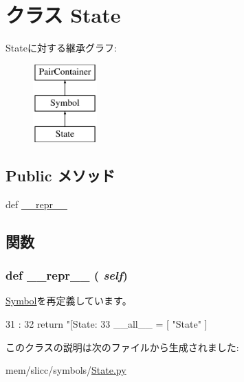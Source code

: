 \hypertarget{classslicc_1_1symbols_1_1State_1_1State}{
\section{クラス State}
\label{classslicc_1_1symbols_1_1State_1_1State}
}
Stateに対する継承グラフ:\begin{figure}[H]
\begin{center}
\leavevmode
\includegraphics[height=3cm]{classslicc_1_1symbols_1_1State_1_1State}
\end{center}
\end{figure}
\subsection*{Public メソッド}
\begin{DoxyCompactItemize}
\item 
def \hyperlink{classslicc_1_1symbols_1_1State_1_1State_ad8b9328939df072e4740cd9a63189744}{\_\-\_\-repr\_\-\_\-}
\end{DoxyCompactItemize}


\subsection{関数}
\hypertarget{classslicc_1_1symbols_1_1State_1_1State_ad8b9328939df072e4740cd9a63189744}{
\subsubsection[{\_\-\_\-repr\_\-\_\-}]{\setlength{\rightskip}{0pt plus 5cm}def \_\-\_\-repr\_\-\_\- ( {\em self})}}
\label{classslicc_1_1symbols_1_1State_1_1State_ad8b9328939df072e4740cd9a63189744}


\hyperlink{classslicc_1_1symbols_1_1Symbol_1_1Symbol_ad8b9328939df072e4740cd9a63189744}{Symbol}を再定義しています。


\begin{DoxyCode}
31                       :
32         return "[State: %
33 
__all__ = [ "State" ]
\end{DoxyCode}


このクラスの説明は次のファイルから生成されました:\begin{DoxyCompactItemize}
\item 
mem/slicc/symbols/\hyperlink{State_8py}{State.py}\end{DoxyCompactItemize}
